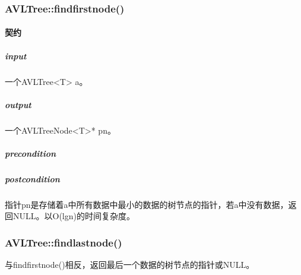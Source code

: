 \documentclass[a4paper]{book}
\numberwithin{equation}{chapter}
\theoremstyle{definition}
\begin{document}
\subsubsection{AVLTree::findfirstnode()}
\paragraph{契约}
\subparagraph{input}
一个AVLTree<T> a。
\subparagraph{output}
一个AVLTreeNode<T>* pn。
\subparagraph{precondition}

\subparagraph{postcondition}
指针pn是存储着a中所有数据中最小的数据的树节点的指针，若a中没有数据，返回NULL。以O(lgn)的时间复杂度。
\subsubsection{AVLTree::findlastnode()}
与findfirstnode()相反，返回最后一个数据的树节点的指针或NULL。
%
%
%
%

%

\end{document}
